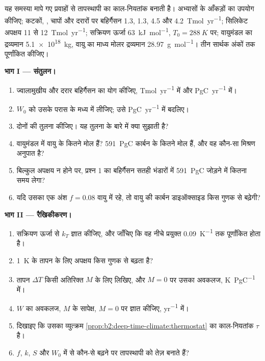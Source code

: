 \begin{problem}\label{pb:b2:deep-time-climate:1}
यह समस्या मापे गए प्रवाहों से तापस्थापी का काल-नियतांक बनाती है। अभ्यासों के आँकड़ों का उपयोग कीजिए;
कटकों, , चापों और दरारों पर बहिर्गैसन \num{1.3}, \num{1.3}, 4.5 और
\qty{4.2}{Tmol.yr^{-1}}; सिलिकेट अपक्षय 11 से \qty{12}{Tmol.yr^{-1}}; सक्रियण ऊर्जा
\qty{63}{kJ.mol^{-1}}, $T_0 = \qty{288}{K}$ पर; वायुमंडल का द्रव्यमान \qty{5.1e18}{kg}, वायु का माध्य मोलर
द्रव्यमान \qty{28.97}{g.mol^{-1}}। तीन सार्थक अंकों तक पूर्णांकित कीजिए।

\noindent\textbf{भाग I --- संतुलन।}
\begin{enumerate}
  \item ज्वालामुखीय और दरार बहिर्गैसन का योग कीजिए, \unit{Tmol.yr^{-1}} में और \unit{PgC.yr^{-1}} में।
  \item $W_0$ को उसके परास के मध्य में लीजिए; उसे \unit{PgC.yr^{-1}} में बदलिए।
  \item दोनों की तुलना कीजिए। यह तुलना  के बारे में क्या सुझाती है?
  \item वायुमंडल में वायु के कितने मोल हैं? \qty{591}{PgC} कार्बन के कितने मोल हैं,
        और वह कौन-सा मिश्रण अनुपात है?
  \item बिल्कुल अपक्षय न होने पर, प्रश्न 1 का बहिर्गैसन सतही भंडारों में
        \qty{591}{PgC} जोड़ने में कितना समय लेगा?
  \item यदि उसका एक अंश $f = 0.08$ वायु में रहे, तो वायु की कार्बन
        डाइऑक्साइड किस गुणक से बढ़ेगी?
\end{enumerate}

\noindent\textbf{भाग II --- रैखिकीकरण।}
\begin{enumerate}[resume]
  \item सक्रियण ऊर्जा से $k_T$ ज्ञात कीजिए, और जाँचिए कि वह नीचे प्रयुक्त
        \qty{0.09}{K^{-1}} तक पूर्णांकित होता है।
  \item \qty{1}{K} के तापन के लिए अपक्षय किस गुणक से बढ़ता है?
  \item तापन $\Delta T$ किसी अतिरिक्त $M$ के लिए लिखिए, और $M = 0$ पर उसका अवकलज,
        \unit{K.PgC^{-1}} में।
  \item $W$ का अवकलज, $M$ के सापेक्ष, $M = 0$ पर ज्ञात कीजिए, \unit{yr^{-1}} में।
  \item दिखाइए कि उसका व्युत्क्रम \cref{prop:b2:deep-time-climate:thermostat} का
        काल-नियतांक $\tau$ है।
  \item $f$, $k$, $S$ और $W_0$ में से कौन-से बढ़ने पर तापस्थापी को तेज़ बनाते हैं?
\end{enumerate}


\end{problem}

